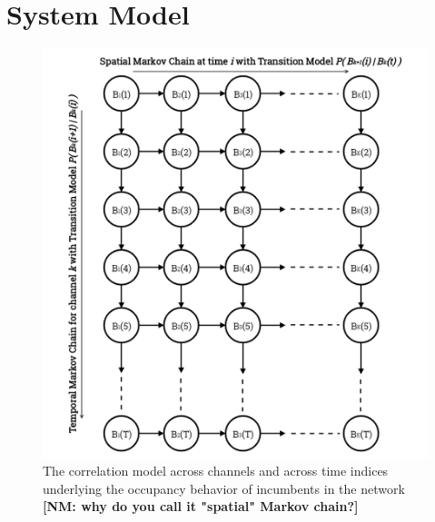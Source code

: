 \documentclass[10pt,twocolumn]{IEEEtran}
\newcommand{\nm}[1]{{\color{blue}\bf{[NM: #1]}}}
\begin{document}
\section{System Model}
\begin{figure}
    \centering
    \includegraphics[scale=0.252]{minerva_occupancy_markov_chain.png}
    \caption{The correlation model across channels and across time indices underlying the occupancy behavior of incumbents in the network
    \nm{why do you call it "spatial" Markov chain?}}
    \label{fig:Figure 1}
\end{figure}
\end{document}
